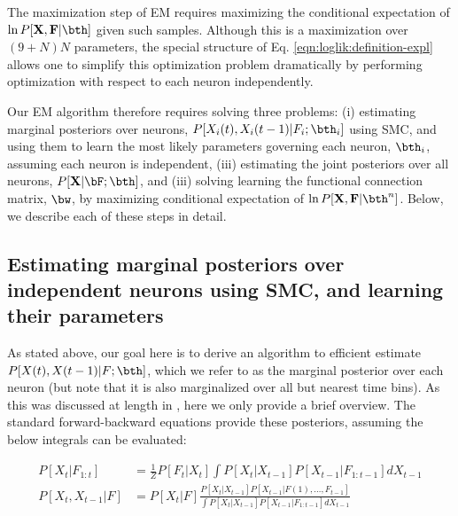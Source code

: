 The maximization step of EM requires maximizing the conditional expectation of $\ln P[{\bf X}, {\bf F} | \bth]$ given such samples. Although this is a maximization over $(9+N)N$ parameters, the special structure of Eq. \eqref{eqn:loglik:definition-expl} allows one to simplify this optimization problem dramatically by performing optimization with respect to each neuron independently.  

Our EM algorithm therefore requires solving three problems: (i) estimating marginal posteriors over neurons, $P[X_i(t), X_i(t-1) | F_i; \bth_i]$ using SMC, and using them to learn the most likely parameters governing each neuron, $\bth_i$, assuming each neuron is independent,  (iii) estimating the joint posteriors over all neurons,  $P[{\bf X}| \bF; \bth]$, and (iii) solving learning the functional connection matrix, $\bw$, by maximizing conditional expectation of  $\ln P[{\bf X}, {\bf F}| \bth^n]$.  Below, we describe each of these steps in detail.


\subsection{Estimating marginal posteriors over independent neurons using SMC, and learning their parameters}
\label{sec:methods:indep}

As stated above, our goal here is to derive an algorithm to efficient estimate $P[X(t), X(t-1) | F; \bth]$, which we refer to as the marginal posterior over each neuron (but note that it is also marginalized over all but nearest time bins).  As this was discussed at length in \cite{Vogelstein2009}, here we only provide a brief overview.  The standard forward-backward equations provide these posteriors, assuming the below integrals can be evaluated:

\begin{align}
	P[X_t | F_{1:t}] &= \frac{1}{Z} P[F_t| X_t] \int P[X_t | X_{t-1}] P[X_{t-1} | F_{1:t-1}] dX_{t-1} \label{eqn:forward} \\
	P[X_t, X_{t-1} | F] &= P[X_t | F] \frac{P[X_t | X_{t-1}] P[X_{t-1} | F(1), \ldots, F_{t-1}]}{\int P[X_t | X_{t-1}] P[X_{t-1} | F_{1:t-1}] dX_{t-1}} \label{eqn:backward}
\end{align}


